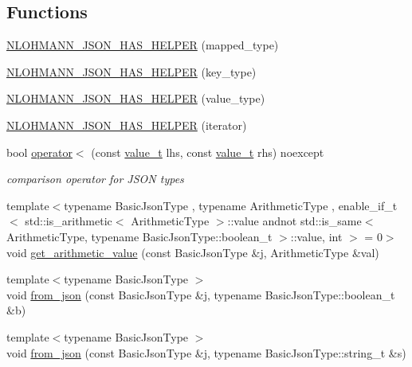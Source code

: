 \subsection*{Functions}
\begin{DoxyCompactItemize}
\item 
\hyperlink{namespacenlohmann_1_1detail_a7b2601c238073c43a07862768b319cf8}{N\+L\+O\+H\+M\+A\+N\+N\+\_\+\+J\+S\+O\+N\+\_\+\+H\+A\+S\+\_\+\+H\+E\+L\+P\+ER} (mapped\+\_\+type)
\item 
\hyperlink{namespacenlohmann_1_1detail_ad19328f0c4ffe2890ecafb7c89e0355b}{N\+L\+O\+H\+M\+A\+N\+N\+\_\+\+J\+S\+O\+N\+\_\+\+H\+A\+S\+\_\+\+H\+E\+L\+P\+ER} (key\+\_\+type)
\item 
\hyperlink{namespacenlohmann_1_1detail_af3e900eb1e0b107c812f7babbb94e69e}{N\+L\+O\+H\+M\+A\+N\+N\+\_\+\+J\+S\+O\+N\+\_\+\+H\+A\+S\+\_\+\+H\+E\+L\+P\+ER} (value\+\_\+type)
\item 
\hyperlink{namespacenlohmann_1_1detail_a6648328c4b1466fdc48f1fcfbff23e2f}{N\+L\+O\+H\+M\+A\+N\+N\+\_\+\+J\+S\+O\+N\+\_\+\+H\+A\+S\+\_\+\+H\+E\+L\+P\+ER} (iterator)
\item 
bool \hyperlink{namespacenlohmann_1_1detail_a09169efff3bd1771fff29bd92cea19e0}{operator$<$} (const \hyperlink{namespacenlohmann_1_1detail_a1ed8fc6239da25abcaf681d30ace4985}{value\+\_\+t} lhs, const \hyperlink{namespacenlohmann_1_1detail_a1ed8fc6239da25abcaf681d30ace4985}{value\+\_\+t} rhs) noexcept
\begin{DoxyCompactList}\small\item\em comparison operator for J\+S\+ON types \end{DoxyCompactList}\item 
{\footnotesize template$<$typename Basic\+Json\+Type , typename Arithmetic\+Type , enable\+\_\+if\+\_\+t$<$ std\+::is\+\_\+arithmetic$<$ Arithmetic\+Type $>$\+::value andnot std\+::is\+\_\+same$<$ Arithmetic\+Type, typename Basic\+Json\+Type\+::boolean\+\_\+t $>$\+::value, int $>$  = 0$>$ }\\void \hyperlink{namespacenlohmann_1_1detail_a85955b9c6dd31846e4b8e891f78614b6}{get\+\_\+arithmetic\+\_\+value} (const Basic\+Json\+Type \&j, Arithmetic\+Type \&val)
\item 
{\footnotesize template$<$typename Basic\+Json\+Type $>$ }\\void \hyperlink{namespacenlohmann_1_1detail_a58117f225f43d03e3a0a4a6f3d77c9d9}{from\+\_\+json} (const Basic\+Json\+Type \&j, typename Basic\+Json\+Type\+::boolean\+\_\+t \&b)
\item 
{\footnotesize template$<$typename Basic\+Json\+Type $>$ }\\void \hyperlink{namespacenlohmann_1_1detail_ad74d89f77ada7a57eff38b43d4bf2335}{from\+\_\+json} (const Basic\+Json\+Type \&j, typename Basic\+Json\+Type\+::string\+\_\+t \&s)

\end{DoxyCompactItemize}
